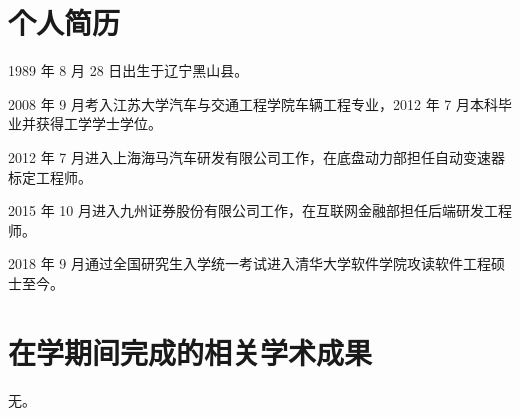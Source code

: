 
\begin{resume}

  \section*{个人简历}

  1989 年 8 月 28 日出生于辽宁黑山县。

  2008 年 9 月考入江苏大学汽车与交通工程学院车辆工程专业，2012 年 7 月本科毕业并获得工学学士学位。

  2012 年 7 月进入上海海马汽车研发有限公司工作，在底盘动力部担任自动变速器标定工程师。

  2015 年 10 月进入九州证券股份有限公司工作，在互联网金融部担任后端研发工程师。

  2018 年 9 月通过全国研究生入学统一考试进入清华大学软件学院攻读软件工程硕士至今。


  \section*{在学期间完成的相关学术成果}
  无。






\end{resume}

